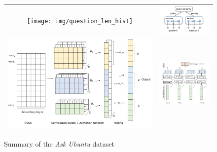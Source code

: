 \documentclass{sigkddExp}
\begin{document}
\begin{figure}[h]
\centering
\begin{tabular}{cc}
    \texttt{[image: img/question\_len\_hist]}
&   \includegraphics[width=\columnwidth]{img/similar}
\\
   \includegraphics[width=\columnwidth]{img/cnn}
&   \includegraphics[width=\columnwidth]{img/lstm}
\end{tabular}
\label{fig:len_hist}
\caption{Summary of the \textit{Ask Ubuntu} dataset}
\end{figure}
\end{document}
